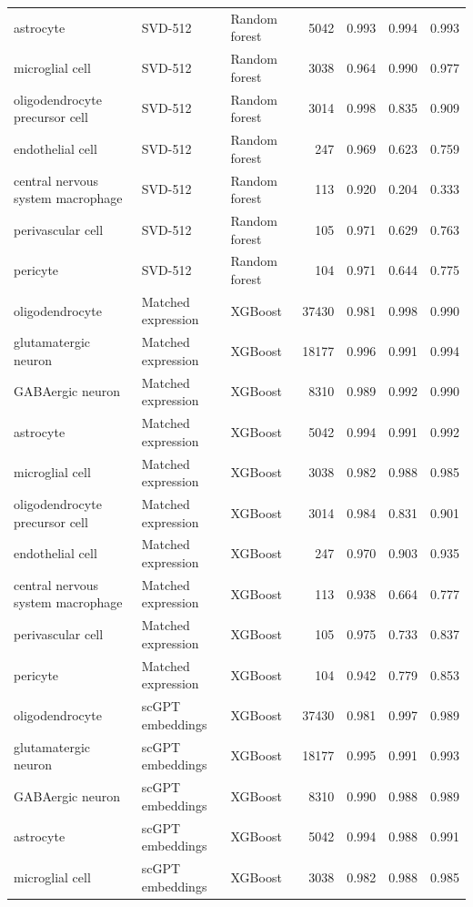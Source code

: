 {\begin{longtable}{>{\raggedright\arraybackslash}p{4.2cm}llrrrr}
astrocyte & SVD-512 & Random forest & 5042 & 0.993 & 0.994 & 0.993 \\
microglial cell & SVD-512 & Random forest & 3038 & 0.964 & 0.990 & 0.977 \\
oligodendrocyte precursor cell & SVD-512 & Random forest & 3014 & 0.998 & 0.835 & 0.909 \\
endothelial cell & SVD-512 & Random forest & 247 & 0.969 & 0.623 & 0.759 \\
central nervous system macrophage & SVD-512 & Random forest & 113 & 0.920 & 0.204 & 0.333 \\
perivascular cell & SVD-512 & Random forest & 105 & 0.971 & 0.629 & 0.763 \\
pericyte & SVD-512 & Random forest & 104 & 0.971 & 0.644 & 0.775 \\
oligodendrocyte & Matched expression & XGBoost & 37430 & 0.981 & 0.998 & 0.990 \\
glutamatergic neuron & Matched expression & XGBoost & 18177 & 0.996 & 0.991 & 0.994 \\
GABAergic neuron & Matched expression & XGBoost & 8310 & 0.989 & 0.992 & 0.990 \\
astrocyte & Matched expression & XGBoost & 5042 & 0.994 & 0.991 & 0.992 \\
microglial cell & Matched expression & XGBoost & 3038 & 0.982 & 0.988 & 0.985 \\
oligodendrocyte precursor cell & Matched expression & XGBoost & 3014 & 0.984 & 0.831 & 0.901 \\
endothelial cell & Matched expression & XGBoost & 247 & 0.970 & 0.903 & 0.935 \\
central nervous system macrophage & Matched expression & XGBoost & 113 & 0.938 & 0.664 & 0.777 \\
perivascular cell & Matched expression & XGBoost & 105 & 0.975 & 0.733 & 0.837 \\
pericyte & Matched expression & XGBoost & 104 & 0.942 & 0.779 & 0.853 \\
oligodendrocyte & scGPT embeddings & XGBoost & 37430 & 0.981 & 0.997 & 0.989 \\
glutamatergic neuron & scGPT embeddings & XGBoost & 18177 & 0.995 & 0.991 & 0.993 \\
GABAergic neuron & scGPT embeddings & XGBoost & 8310 & 0.990 & 0.988 & 0.989 \\
astrocyte & scGPT embeddings & XGBoost & 5042 & 0.994 & 0.988 & 0.991 \\
microglial cell & scGPT embeddings & XGBoost & 3038 & 0.982 & 0.988 & 0.985 \\

\end{longtable}}
